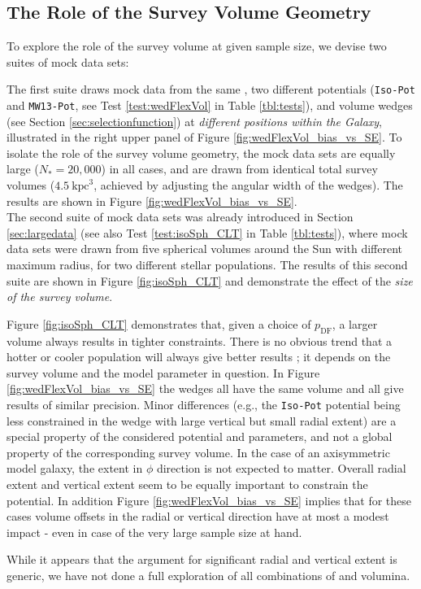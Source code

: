 \subsection{The Role of the Survey Volume Geometry} \label{sec:results_obsvolume}


To explore the role of the survey volume at given sample size, we devise two suites of mock data sets: 

The first suite draws mock data from the same \pmodel{}, two different potentials (\texttt{Iso-Pot} and \texttt{MW13-Pot}, see Test \ref{test:wedFlexVol} in Table \ref{tbl:tests}), and volume wedges (see Section \ref{sec:selectionfunction}) at {\it different positions within the Galaxy}, illustrated in the right upper panel of Figure \ref{fig:wedFlexVol_bias_vs_SE}. To isolate the role of the survey volume geometry, the mock data sets are equally large ($N_{*} = 20,000$) in all cases, and are drawn from identical total survey volumes ($4.5~\text{kpc}^3$, achieved by adjusting the angular width of the wedges). The results are shown in Figure \ref{fig:wedFlexVol_bias_vs_SE}.
\\The second suite of mock data sets was already introduced in Section \ref{sec:largedata} (see also Test \ref{test:isoSph_CLT} in Table \ref{tbl:tests}), where mock data sets were drawn from five spherical volumes around the Sun with different maximum radius, for two different stellar populations. The results of this second suite are shown in Figure \ref{fig:isoSph_CLT} and demonstrate the effect of the {\it size of the survey volume}.

Figure \ref{fig:isoSph_CLT} demonstrates that, given a choice of $p_\text{DF}$, a larger volume always results in tighter constraints. There is no obvious trend that a hotter or cooler population will always give better results ; it depends on the survey volume and the model parameter in question. In Figure \ref{fig:wedFlexVol_bias_vs_SE} the wedges all have the same volume and all give results of similar precision. Minor differences (e.g., the \texttt{Iso-Pot} potential being less constrained in the wedge with large vertical but small radial extent) are a special property of the considered potential and parameters, and not a global property of the corresponding survey volume. In the case of an axisymmetric model galaxy, the extent in $\phi$ direction is not expected to matter. Overall radial extent and vertical extent seem to be equally important to constrain the potential. In addition Figure \ref{fig:wedFlexVol_bias_vs_SE} implies that for these cases volume offsets in the radial or vertical direction have at most a modest impact - even in case of the very large sample size at hand.

While it appears that the argument for significant radial and vertical extent is generic, we have not done a full exploration of all combinations of \pmodel{} and volumina.


